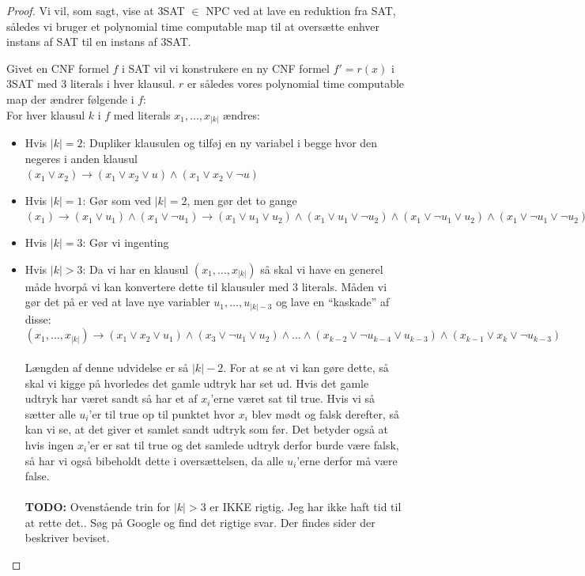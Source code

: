 \begin{proof}
 Vi vil, som sagt, vise at 3SAT $\in$ NPC ved at lave en reduktion fra SAT, således vi bruger et polynomial time computable map til at oversætte enhver instans af SAT til en instans af 3SAT. 

Givet en CNF formel $f$ i SAT vil vi konstrukere en ny CNF formel $f' = r(x)$ i 3SAT med 3 literals i hver klausul. $r$ er således vores polynomial time computable map der ændrer følgende i $f$:\\

For hver klausul $k$ i $f$ med literals $x_1, \hdots, x_{|k|}$ ændres:
\begin{itemize}
 \item Hvis $|k| = 2$: Dupliker klausulen og tilføj en ny variabel i begge hvor den negeres i anden klausul \\
      $(x_1 \vee x_2) \rightarrow (x_1 \vee x_2 \vee u) \wedge (x_1 \vee x_2 \vee \neg u)$
 \item Hvis $|k| = 1$: Gør som ved $|k| = 2$, men gør det to gange \\
      $(x_1) \rightarrow (x_1 \vee u_1) \wedge (x_1 \vee \neg u_1) \rightarrow (x_1 \vee u_1 \vee u_2) \wedge (x_1 \vee u_1 \vee \neg u_2) \wedge (x_1 \vee \neg u_1 \vee u_2) \wedge (x_1 \vee \neg u_1 \vee \neg u_2)$
 \item Hvis $|k| = 3$: Gør vi ingenting
 \item Hvis $|k| > 3$: Da vi har en klausul $(x_1,\hdots,x_{|k|})$ så skal vi have en generel måde hvorpå vi kan konvertere dette til klausuler med 3 literals. Måden vi gør det på er ved at lave nye variabler $u_1,\hdots,u_{|k|-3}$ og lave en ``kaskade'' af disse:\\
      $(x_1,\hdots,x_{|k|}) \rightarrow (x_1 \vee x_2 \vee u_1) \wedge (x_3 \vee \neg u_1 \vee u_2) \wedge \hdots \wedge (x_{k-2} \vee \neg u_{k-4} \vee u_{k-3}) \wedge (x_{k-1} \vee x_k \vee \neg u_{k-3})$ \\
      ~\\
      Længden af denne udvidelse er så $|k|-2$.
      For at se at vi kan gøre dette, så skal vi kigge på hvorledes det gamle udtryk har set ud. Hvis det gamle udtryk har været sandt så har et af $x_i$'erne været sat til true. Hvis vi så sætter alle $u_i$'er til true op til punktet hvor $x_i$ blev mødt og falsk derefter, så kan vi se, at det giver et samlet sandt udtryk som før. Det betyder også at hvis ingen $x_i$'er er sat til true og det samlede udtryk derfor burde være falsk, så har vi også bibeholdt dette i oversættelsen, da alle $u_i$'erne derfor må være false.\\
      ~\\
      \textbf{TODO:} Ovenstående trin for $|k| > 3$ er IKKE rigtig. Jeg har ikke haft tid til at rette det.. Søg på Google og find det rigtige svar. Der findes sider der beskriver beviset.
\end{itemize}


\end{proof}
